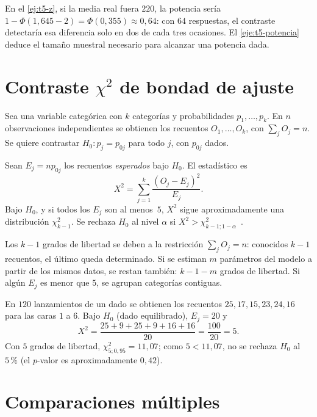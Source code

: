 En el \cref{ej:t5-z}, si la media real fuera $220$, la potencia sería $1-\Phi(1{,}645-2)=\Phi(0{,}355)\approx0{,}64$: con $64$ respuestas, el contraste detectaría esa diferencia solo en dos de cada tres ocasiones. El \cref{eje:t5-potencia} deduce el tamaño muestral necesario para alcanzar una potencia dada.

\section{Contraste \texorpdfstring{$\chi^{2}$}{chi cuadrado} de bondad de ajuste}

Sea una variable categórica con $k$ categorías y probabilidades $p_1,\dots,p_k$. En $n$ observaciones independientes se obtienen los recuentos $O_1,\dots,O_k$, con $\sum_jO_j=n$. Se quiere contrastar $H_0:p_j=p_{0j}$ para todo $j$, con $p_{0j}$ dados.

\begin{definicion}\label{def:t5-chi2}
Sean $E_j=np_{0j}$ los recuentos \emph{esperados} bajo $H_0$. El estadístico es
\[
X^{2}=\sum_{j=1}^{k}\frac{(O_j-E_j)^{2}}{E_j}.
\]
Bajo $H_0$, y si todos los $E_j$ son al menos~$5$, $X^{2}$ sigue aproximadamente una distribución $\chi^{2}_{k-1}$. Se rechaza $H_0$ al nivel $\alpha$ si $X^{2}>\chi^{2}_{k-1;1-\alpha}$~\cite[§11.2]{openstax}.
\end{definicion}

Los $k-1$ grados de libertad se deben a la restricción $\sum_jO_j=n$: conocidos $k-1$ recuentos, el último queda determinado. Si se estiman $m$ parámetros del modelo a partir de los mismos datos, se restan también: $k-1-m$ grados de libertad. Si algún $E_j$ es menor que $5$, se agrupan categorías contiguas.

\begin{ejemplo}\label{ej:t5-dado}
En $120$ lanzamientos de un dado se obtienen los recuentos $25,17,15,23,24,16$ para las caras $1$ a $6$. Bajo $H_0$ (dado equilibrado), $E_j=20$ y
\[
X^{2}=\frac{25+9+25+9+16+16}{20}=\frac{100}{20}=5.
\]
Con $5$ grados de libertad, $\chi^{2}_{5;0{,}95}=11{,}07$; como $5<11{,}07$, no se rechaza $H_0$ al $5\,\%$ (el $p$-valor es aproximadamente $0{,}42$).
\end{ejemplo}

\section{Comparaciones múltiples}

